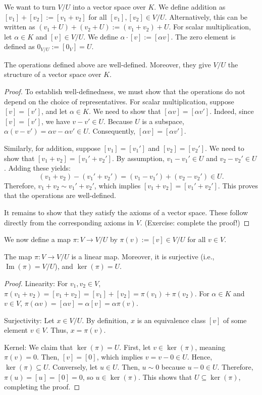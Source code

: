 We want to turn $V/U$ into a vector space over $K$. We define addition as $[v_1] + [v_2] := [v_1 + v_2]$ for all $[v_1], [v_2] \in V/U$. Alternatively, this can be written as $(v_1 + U) + (v_2 + U) := (v_1 + v_2) + U$. For scalar multiplication, let $\alpha \in K$ and $[v] \in V/U$. We define $\alpha \cdot [v] := [\alpha v]$. The zero element is defined as $0_{V/U} := [0_V] = U$.

\begin{proposition}
  The operations defined above are well-defined. Moreover, they give $V/U$ the structure of a vector space over $K$.
\end{proposition}

\begin{proof}
  To establish well-definedness, we must show that the operations do not depend on the choice of representatives.
  For scalar multiplication, suppose $[v] = [v']$, and let $\alpha \in K$. We need to show that $[\alpha v] = [\alpha v']$. Indeed, since $[v] = [v']$, we have $v - v' \in U$. Because $U$ is a subspace, $\alpha(v - v') = \alpha v - \alpha v' \in U$. Consequently, $[\alpha v] = [\alpha v']$.

  Similarly, for addition, suppose $[v_1] = [v_1']$ and $[v_2] = [v_2']$. We need to show that $[v_1 + v_2] = [v_1' + v_2']$. By assumption, $v_1 - v_1' \in U$ and $v_2 - v_2' \in U$. Adding these yields:
  \[ (v_1 + v_2) - (v_1' + v_2') = (v_1 - v_1') + (v_2 - v_2') \in U. \]
  Therefore, $v_1 + v_2 \sim v_1' + v_2'$, which implies $[v_1 + v_2] = [v_1' + v_2']$. This proves that the operations are well-defined.

  It remains to show that they satisfy the axioms of a vector space. These follow directly from the corresponding axioms in $V$. (Exercise: complete the proof!)
\end{proof}

We now define a map $\pi \colon V \to V/U$ by $\pi(v) := [v] \in V/U$ for all $v \in V$.

\begin{proposition}
  The map $\pi \colon V \to V/U$ is a linear map. Moreover, it is surjective (i.e., $\operatorname{Im}(\pi) = V/U$), and $\ker(\pi) = U$.
\end{proposition}

\begin{proof}
  Linearity: For $v_1, v_2 \in V$, $\pi(v_1 + v_2) = [v_1 + v_2] = [v_1] + [v_2] = \pi(v_1) + \pi(v_2)$. For $\alpha \in K$ and $v \in V$, $\pi(\alpha v) = [\alpha v] = \alpha [v] = \alpha \pi(v)$.

  Surjectivity: Let $x \in V/U$. By definition, $x$ is an equivalence class $[v]$ of some element $v \in V$. Thus, $x = \pi(v)$.

  Kernel: We claim that $\ker(\pi) = U$. First, let $v \in \ker(\pi)$, meaning $\pi(v) = 0$. Then, $[v] = [0]$, which implies $v = v - 0 \in U$. Hence, $\ker(\pi) \subseteq U$. Conversely, let $u \in U$. Then, $u \sim 0$ because $u - 0 \in U$. Therefore, $\pi(u) = [u] = [0] = 0$, so $u \in \ker(\pi)$. This shows that $U \subseteq \ker(\pi)$, completing the proof.
\end{proof}

